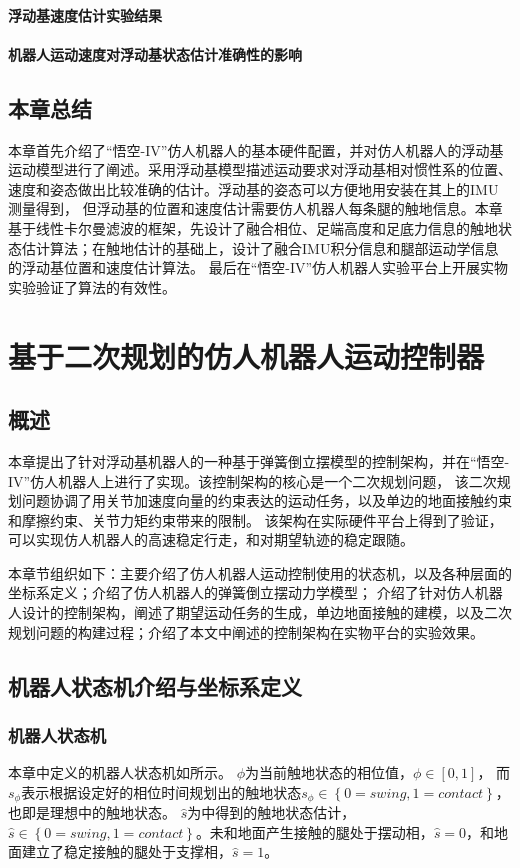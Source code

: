 \subsubsection{浮动基速度估计实验结果}
\subsubsection{机器人运动速度对浮动基状态估计准确性的影响}
\section{本章总结}
本章首先介绍了“悟空-IV”仿人机器人的基本硬件配置，并对仿人机器人的浮动基运动模型进行了阐述。采用浮动基模型描述运动要求对浮动基相对惯性系的位置、速度和姿态做出比较准确的估计。浮动基的姿态可以方便地用安装在其上的IMU测量得到，
但浮动基的位置和速度估计需要仿人机器人每条腿的触地信息。本章基于线性卡尔曼滤波的框架，先设计了融合相位、足端高度和足底力信息的触地状态估计算法；在触地估计的基础上，设计了融合IMU积分信息和腿部运动学信息的浮动基位置和速度估计算法。
最后在“悟空-IV”仿人机器人实验平台上开展实物实验验证了算法的有效性。
\chapter{基于二次规划的仿人机器人运动控制器}
\section{概述}
本章提出了针对浮动基机器人的一种基于弹簧倒立摆模型的控制架构，并在“悟空-IV”仿人机器人上进行了实现。该控制架构的核心是一个二次规划问题，
该二次规划问题协调了用关节加速度向量的约束表达的运动任务，以及单边的地面接触约束和摩擦约束、关节力矩约束带来的限制。
该架构在实际硬件平台上得到了验证，可以实现仿人机器人的高速稳定行走，和对期望轨迹的稳定跟随。

本章节组织如下：主要介绍了仿人机器人运动控制使用的状态机，以及各种层面的坐标系定义；介绍了仿人机器人的弹簧倒立摆动力学模型；
介绍了针对仿人机器人设计的控制架构，阐述了期望运动任务的生成，单边地面接触的建模，以及二次规划问题的构建过程；介绍了本文中阐述的控制架构在实物平台的实验效果。
\section{机器人状态机介绍与坐标系定义}
\label{sec:state_machine}
\subsection{机器人状态机}
本章中定义的机器人状态机如所示。
$\phi$为当前触地状态的相位值，$\phi \in \left[0, 1\right]$，
而$s_{\phi}$表示根据设定好的相位时间规划出的触地状态$s_{\phi} \in \left\{0=swing, 1=contact\right\}$，
也即是理想中的触地状态。
$\hat s$为中得到的触地状态估计，$\hat s \in \left\{0=swing, 1=contact\right\}$。未和地面产生接触的腿处于摆动相，$\hat s = 0$，和地面建立了稳定接触的腿处于支撑相，$\hat s = 1$。


